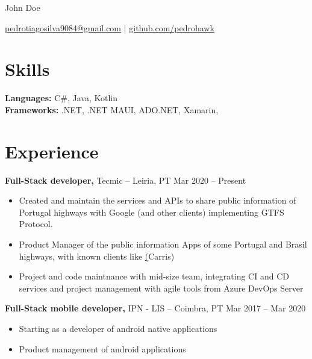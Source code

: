\documentclass[11pt]{article}       %
\begin{document}
\centerline{\Huge John Doe}

\vspace{5pt}

\centerline{\href{mailto:pedrotiagosilva9084@gmail.com}{pedrotiagosilva9084@gmail.com} | \href{https://github.com/pedrohawk}{github.com/pedrohawk}}

\vspace{-10pt}

\section*{Skills}
\textbf{Languages:} C#, Java, Kotlin \\
\textbf{Frameworks:} .NET, .NET MAUI, ADO.NET, Xamarin, 

\vspace{-6.5pt}

\section*{Experience}
\textbf{Full-Stack developer,} {Tecmic} -- Leiria, PT \hfill Mar 2020 -- Present \\
\vspace{-9pt}
\begin{itemize}
  \item Created and maintain the services and APIs to share public information of Portugal highways with Google (and other clients) implementing GTFS Protocol. 
  \item Product Manager of the public information Apps of some Portugal and Brasil highways, with known clients like \href{https://play.google.com/store/search?q=carris&c=apps}(Carris) 
  \item Project and code maintnance with mid-size team, integrating CI and CD services and project management with agile tools from Azure DevOps Server
\end{itemize}

\textbf{Full-Stack mobile developer,} {IPN - LIS} -- Coimbra, PT \hfill Mar 2017 -- Mar 2020 \\
\vspace{-9pt}
\begin{itemize}
  \item Starting as a developer of android native applications
  \item Product management of android applications
\end{itemize}
\end{document}
